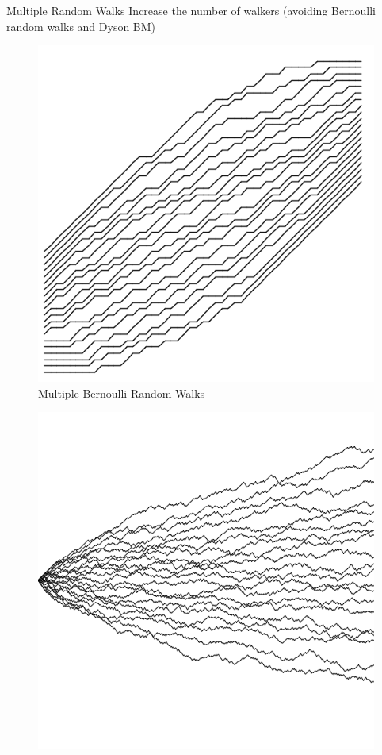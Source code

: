 \documentclass[9pt,t,dvipsnames]{beamer}
\begin{document}
\begin{frame}{Multiple Random Walks}
Increase the number of walkers (avoiding Bernoulli random walks and Dyson BM)
\begin{figure}
	\includegraphics[height=0.25\textheight]{graphics/MultipleBernoulli.png}
	\caption{Multiple Bernoulli Random Walks}
\end{figure}
\begin{figure}
\includegraphics[height=0.25\textheight]{graphics/DysonBrownian.png}
\end{figure}
\end{frame}
\end{document}
